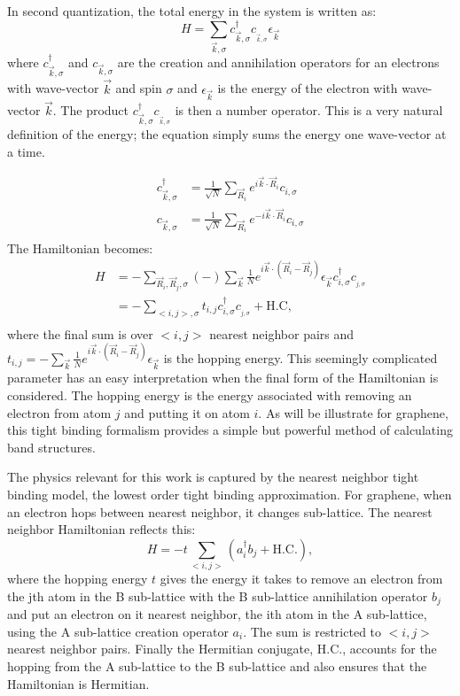In second quantization, the total energy in the system is written as:
\begin{equation*}
	H=\sum_{\vec{k},\sigma} c^{\dagger}_{\vec{k},\sigma} c__{\vec{k},\sigma} \epsilon_{\vec{k}}
\end{equation*}
where $c^{\dagger}_{\vec{k},\sigma}$ and $c_{\vec{k},\sigma}$ are the creation and annihilation operators for an electrons with wave-vector $\vec{k}$ and spin $\sigma$ and $\epsilon_{\vec{k}}$ is the energy of the electron with wave-vector $\vec{k}$.
The product $c^{\dagger}_{\vec{k},\sigma} c__{\vec{k},\sigma}$ is then a number operator.
This is a very natural definition of the energy; the equation simply sums the energy one wave-vector at a time.

\begin{align*}
	c^{\dagger}_{\vec{k},\sigma}&=\frac{1}{\sqrt{N}}\sum_{\vec{R}_i} e^{ i \vec{k} \cdot \vec{R}_i} c_{i,\sigma} \\
	c          _{\vec{k},\sigma}&=\frac{1}{\sqrt{N}}\sum_{\vec{R}_i} e^{-i \vec{k} \cdot \vec{R}_i} c_{i,\sigma} \\
\end{align*}
The Hamiltonian becomes:
\begin{align*}
	H&=-\sum_{\vec{R}_i, \vec{R}_j,\sigma} (-) \sum_{\vec{k}}\frac{1}{N} e^{i \vec{k} \cdot (\vec{R}_i-\vec{R}_j)}
	 \epsilon_{\vec{k}} c^{\dagger}_{i,\sigma} c__{j,\sigma} \\
	 &=-\sum_{<i,j>,\sigma} t_{i,j} c^{\dagger}_{i,\sigma} c__{j,\sigma} + \text{H.C},\\
\end{align*}
where the final sum is over $<i,j>$ nearest neighbor pairs and $t_{i,j}=-\sum_{\vec{k}}\frac{1}{N} e^{i \vec{k} \cdot (\vec{R}_i-\vec{R}_j)}\epsilon_{\vec{k}}$ is the hopping energy.
This seemingly complicated parameter has an easy interpretation when the final form of the Hamiltonian is considered.
The hopping energy is the energy associated with removing an electron from atom $j$ and putting it on atom $i$.
As will be illustrate for graphene, this tight binding formalism provides a simple but powerful method of calculating band structures.

The physics relevant for this work is captured by the nearest neighbor tight binding model, the lowest order tight binding approximation.
For graphene, when an electron hops between nearest neighbor, it changes sub-lattice.
The nearest neighbor Hamiltonian reflects this:
\begin{equation*}
	H=-t \sum_{<i,j>} (a_i^{\dagger} b_j + \text{H.C.}),
\end{equation*}
where the hopping energy $t$ gives the energy it takes to remove an electron from the jth atom in the B sub-lattice with the B sub-lattice annihilation operator $b_j$ and put an electron on it nearest neighbor, the ith atom in the A sub-lattice, using the A sub-lattice creation operator $a_i$.
The sum is restricted to $<i,j>$ nearest neighbor pairs.
Finally the Hermitian conjugate, $\text{H.C.}$, accounts for the hopping from the A sub-lattice to the B sub-lattice and also ensures that the Hamiltonian is Hermitian.

